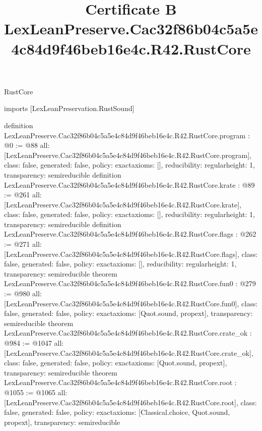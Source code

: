 \begin{lexlean}{RustCore}
\title{Certificate B LexLeanPreserve.Cac32f86b04c5a5e4c84d9f46beb16e4c.R42.RustCore}
\begin{coremodule}
imports [LexLeanPreservation.RustSound]

definition LexLeanPreserve.Cac32f86b04c5a5e4c84d9f46beb16e4c.R42.RustCore.program : @0 := @88 {
  all: [LexLeanPreserve.Cac32f86b04c5a5e4c84d9f46beb16e4c.R42.RustCore.program],
  class: false,
  generated: false,
  policy: exact{axioms: []},
  reducibility: regular{height: 1},
  transparency: semireducible
}
definition LexLeanPreserve.Cac32f86b04c5a5e4c84d9f46beb16e4c.R42.RustCore.krate : @89 := @261 {
  all: [LexLeanPreserve.Cac32f86b04c5a5e4c84d9f46beb16e4c.R42.RustCore.krate],
  class: false,
  generated: false,
  policy: exact{axioms: []},
  reducibility: regular{height: 1},
  transparency: semireducible
}
definition LexLeanPreserve.Cac32f86b04c5a5e4c84d9f46beb16e4c.R42.RustCore.flags : @262 := @271 {
  all: [LexLeanPreserve.Cac32f86b04c5a5e4c84d9f46beb16e4c.R42.RustCore.flags],
  class: false,
  generated: false,
  policy: exact{axioms: []},
  reducibility: regular{height: 1},
  transparency: semireducible
}
theorem LexLeanPreserve.Cac32f86b04c5a5e4c84d9f46beb16e4c.R42.RustCore.fun0 : @279 := @980 {
  all: [LexLeanPreserve.Cac32f86b04c5a5e4c84d9f46beb16e4c.R42.RustCore.fun0],
  class: false,
  generated: false,
  policy: exact{axioms: [Quot.sound, propext]},
  transparency: semireducible
}
theorem LexLeanPreserve.Cac32f86b04c5a5e4c84d9f46beb16e4c.R42.RustCore.crate_ok : @984 := @1047 {
  all: [LexLeanPreserve.Cac32f86b04c5a5e4c84d9f46beb16e4c.R42.RustCore.crate_ok],
  class: false,
  generated: false,
  policy: exact{axioms: [Quot.sound, propext]},
  transparency: semireducible
}
theorem LexLeanPreserve.Cac32f86b04c5a5e4c84d9f46beb16e4c.R42.RustCore.root : @1055 := @1065 {
  all: [LexLeanPreserve.Cac32f86b04c5a5e4c84d9f46beb16e4c.R42.RustCore.root],
  class: false,
  generated: false,
  policy: exact{axioms: [Classical.choice, Quot.sound, propext]},
  transparency: semireducible
}


\end{coremodule}
\end{lexlean}
